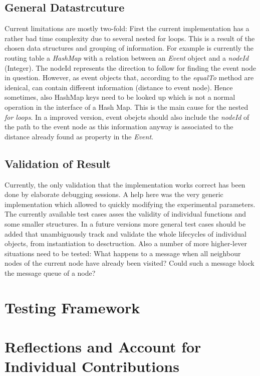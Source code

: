 \documentclass[a4paper,11pt,twoside]{article}
\begin{document}
\subsection{General Datastrcuture}
Current limitations are mostly two-fold: First the current
implementation has a rather bad time complexity due to several nested
for loops. This is a result of the chosen data structures and grouping
of information. For example is currently the routing table a \textit{HashMap}
with a relation between an \textit{Event} object and a \textit{nodeId}
(Integer). The nodeId represents the direction to follow for finding
the event node in question. However, as event objects that, according
to the \textit{equalTo} method are idenical, can contain different information
(distance to event node). Hence sometimes, also HashMap keys need to
be looked up which is not a normal operation in the interface of a
Hash Map. This is the main cause for the nested \textit{for loops}. In a
improved version, event obejcts should also include the \textit{nodeId} of the
path to the event node as this information anyway is associated to the
distance already found as property in the \textit{Event}. 

\subsection{Validation of Result}
Currently, the only validation that the implementation works correct
has been done by elaborate debugging sessions. A help here was the
very generic implementation which allowed to quickly modifying the
experimental parameters. The currently available test cases asses the
validity of individual functions and some smaller structures. In a
future versions more general test cases should be added that
unambiguously track and validate the whole lifecycles of individual
objects, from instantiation to desctruction. 
Also a number of more higher-lever situations need to be tested: What
happens to a message when all neighbour nodes of the current node have
already been visited? Could such a message block the message queue of
a node?   



\section{Testing Framework}


\section{Reflections and Account for Individual Contributions}
\end{document}
